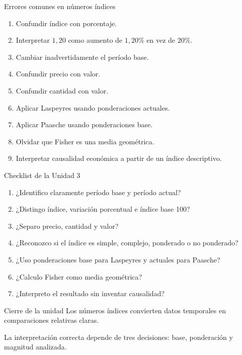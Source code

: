 \documentclass[aspectratio=169,11pt]{beamer}
\begin{document}
\begin{frame}{Errores comunes en números índices}
\small
\begin{enumerate}
  \item Confundir índice con porcentaje.
  \item Interpretar $1{,}20$ como aumento de $1{,}20\%$ en vez de $20\%$.
  \item Cambiar inadvertidamente el período base.
  \item Confundir precio con valor.
  \item Confundir cantidad con valor.
  \item Aplicar Laspeyres usando ponderaciones actuales.
  \item Aplicar Paasche usando ponderaciones base.
  \item Olvidar que Fisher es una media geométrica.
  \item Interpretar causalidad económica a partir de un índice descriptivo.
\end{enumerate}
\end{frame}

\begin{frame}{Checklist de la Unidad 3}
\begin{enumerate}
  \item ¿Identifico claramente período base y período actual?
  \item ¿Distingo índice, variación porcentual e índice base 100?
  \item ¿Separo precio, cantidad y valor?
  \item ¿Reconozco si el índice es simple, complejo, ponderado o no ponderado?
  \item ¿Uso ponderaciones base para Laspeyres y actuales para Paasche?
  \item ¿Calculo Fisher como media geométrica?
  \item ¿Interpreto el resultado sin inventar causalidad?
\end{enumerate}
\end{frame}

\begin{frame}{Cierre de la unidad}
\centering
\Large
Los números índices convierten datos temporales en comparaciones relativas claras.
\vspace{0.8em}

\normalsize
La interpretación correcta depende de tres decisiones: base, ponderación y magnitud analizada.
\end{frame}
\end{document}
